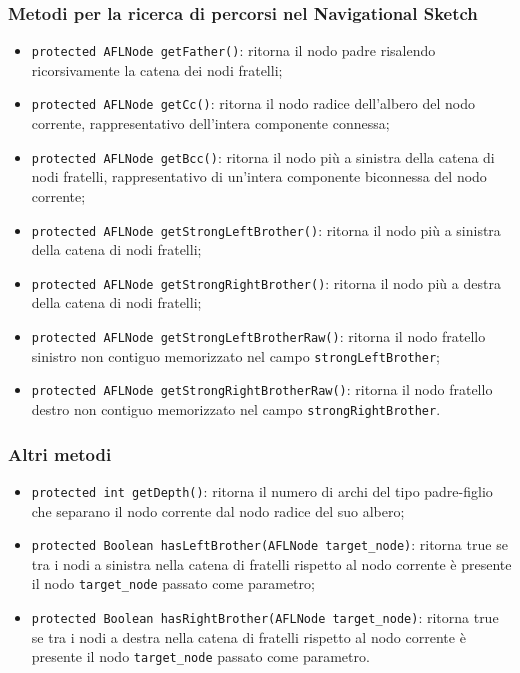 \documentclass[a4paper,11pt]{report}
\begin{document}
\subsubsection{Metodi per la ricerca di percorsi nel Navigational Sketch}
\begin{itemize}
 \item \verb|protected AFLNode getFather()|: ritorna il nodo padre risalendo ricorsivamente la catena dei nodi fratelli;
 \item \verb|protected AFLNode getCc()|: ritorna il nodo radice dell'albero del nodo corrente, rappresentativo dell'intera componente
connessa;
 \item \verb|protected AFLNode getBcc()|: ritorna il nodo più a sinistra della catena di nodi fratelli, rappresentativo di un'intera
componente biconnessa del nodo corrente;
 \item \verb|protected AFLNode getStrongLeftBrother()|: ritorna il nodo più a sinistra della catena di nodi fratelli;
 \item \verb|protected AFLNode getStrongRightBrother()|: ritorna il nodo più a destra della catena di nodi fratelli;
 \item \verb|protected AFLNode getStrongLeftBrotherRaw()|: ritorna il nodo fratello sinistro non contiguo memorizzato nel campo
\verb|strongLeftBrother|;
 \item \verb|protected AFLNode getStrongRightBrotherRaw()|: ritorna il nodo fratello destro non contiguo memorizzato nel campo
\verb|strongRightBrother|.
\end{itemize}

\subsubsection{Altri metodi}
\begin{itemize}
 \item \verb|protected int getDepth()|: ritorna il numero di archi del tipo padre-figlio che separano il nodo corrente dal nodo radice del
suo albero;
 \item \verb|protected Boolean hasLeftBrother(AFLNode target_node)|: ritorna true se tra i nodi a sinistra nella catena di fratelli rispetto
al nodo corrente è presente il
nodo \verb|target_node| passato come parametro;
 \item \verb|protected Boolean hasRightBrother(AFLNode target_node)|: ritorna true se tra i nodi a destra nella catena di fratelli rispetto
al nodo corrente è presente il
nodo \verb|target_node| passato come parametro.
\end{itemize}
\end{document}
